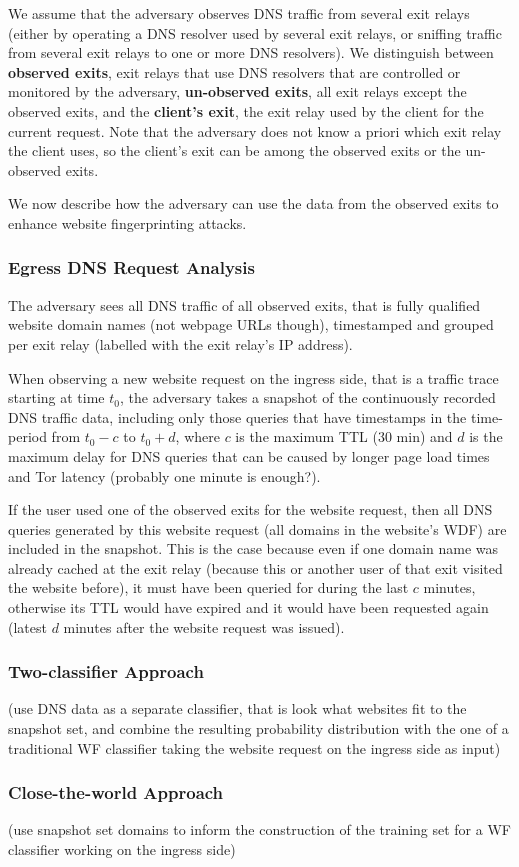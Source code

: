 We assume that the adversary observes DNS traffic from several exit
relays (either by operating a DNS resolver used by several exit relays,
or sniffing traffic from several exit relays to one or more DNS
resolvers).
%
We distinguish between \textbf{observed exits}, \ie exit relays that use
DNS resolvers that are controlled or monitored by the adversary,
\textbf{un-observed exits}, \ie all exit relays except the observed
exits, and the \textbf{client's exit}, \ie the exit relay used by the
client for the current request. 
%
Note that the adversary does not know a priori which exit relay the
client uses, so the client's exit can be among the observed exits or the
un-observed exits.

% 
We now describe how the adversary can use the data from the observed
exits to enhance website fingerprinting attacks.


\subsubsection{Egress DNS Request Analysis}

The adversary sees all DNS traffic of all observed exits, that is fully
qualified website domain names (not webpage URLs though), timestamped
and grouped per exit relay (\eg labelled with the exit relay's IP
address).

When observing a new website request on the ingress side, that is a 
traffic trace starting at time $t_0$, the adversary takes a snapshot
of the continuously recorded DNS traffic data, including only those queries
that have timestamps in the time-period from $t_0 - c$ to $t_0 + d$,
where $c$ is the maximum TTL (30 min) and $d$ is the maximum delay
for DNS queries that can be caused by longer page load times and Tor
latency (probably one minute is enough?).

If the user used one of the observed exits for the website request, then
all DNS queries generated by this website request (\ie all domains in
the website's WDF) are included in the snapshot. This is the case
because even if one domain name was already cached at the exit relay
(because this or another user of that exit visited the website before),
it must have been queried for during the last $c$ minutes, otherwise its
TTL would have expired and it would have been requested again (latest
$d$ minutes after the website request was issued). 

\subsubsection{Two-classifier Approach}
(use DNS data as a separate classifier, that is look what websites fit
to the snapshot set, and combine the resulting probability distribution
with the one of a traditional WF classifier taking the website request
on the ingress side as input) 


\subsubsection{Close-the-world Approach}
(use snapshot set domains to inform the construction of the training set
for a WF classifier working on the ingress side) 


